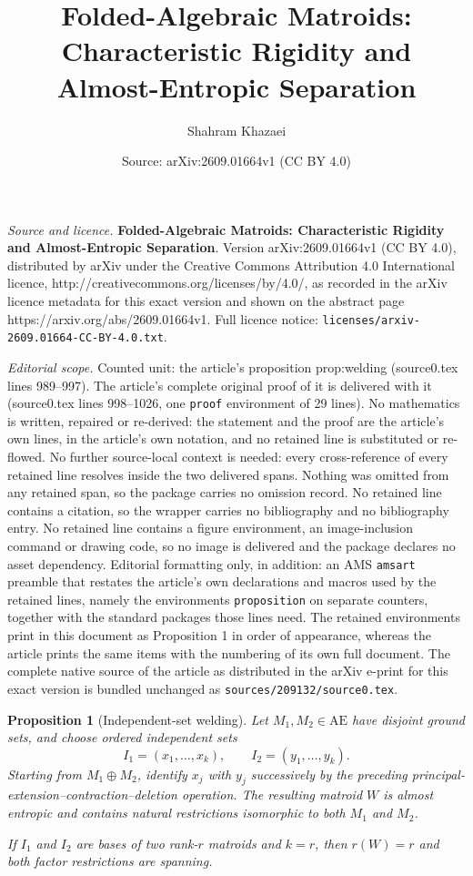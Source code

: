 \documentclass[10pt,a4paper]{amsart}
\title{\textbf{Folded-Algebraic Matroids: Characteristic Rigidity and Almost-Entropic Separation}}
\author{Shahram Khazaei}
\date{Source: arXiv:2609.01664v1 (CC BY 4.0)}
\newtheorem{proposition}{Proposition}
\newcommand{\AlmostEnt}{\mathrm{AE}}
\begin{document}
\maketitle

\noindent\emph{Source and licence.} \textbf{Folded-Algebraic Matroids: Characteristic Rigidity and Almost-Entropic Separation}. Version arXiv:2609.01664v1 (CC BY 4.0), distributed by arXiv under the Creative Commons Attribution 4.0 International licence, http://creativecommons.org/licenses/by/4.0/, as recorded in the arXiv licence metadata for this exact version and shown on the abstract page https://arxiv.org/abs/2609.01664v1. Full licence notice: \texttt{licenses/arxiv-2609.01664-CC-BY-4.0.txt}.\par\smallskip

\noindent\textit{Editorial scope.} Counted unit: the article's proposition prop:welding (source0.tex lines 989--997). The article's complete original proof of it is delivered with it (source0.tex lines 998--1026, one \texttt{proof} environment of 29 lines). No mathematics is written, repaired or re-derived: the statement and the proof are the article's own lines, in the article's own notation, and no retained line is substituted or re-flowed.  No further source-local context is needed: every cross-reference of every retained line resolves inside the two delivered spans.  Nothing was omitted from any retained span, so the package carries no omission record.  No retained line contains a citation, so the wrapper carries no bibliography and no bibliography entry.  No retained line contains a figure environment, an image-inclusion command or drawing code, so no image is delivered and the package declares no asset dependency.  Editorial formatting only, in addition: an AMS \texttt{amsart} preamble that restates the article's own declarations and macros used by the retained lines, namely the environments \texttt{proposition} on separate counters, together with the standard packages those lines need.  The retained environments print in this document as Proposition 1 in order of appearance, whereas the article prints the same items with the numbering of its own full document.  The complete native source of the article as distributed in the arXiv e-print for this exact version is bundled unchanged as \texttt{sources/209132/source0.tex}.
\begin{proposition}[Independent-set welding]\label{prop:welding}
Let $M_1,M_2\in\AlmostEnt$ have disjoint ground sets, and choose ordered independent sets
\[
I_1=(x_1,\dots,x_k),\qquad I_2=(y_1,\dots,y_k).
\]
Starting from $M_1\oplus M_2$, identify $x_j$ with $y_j$ successively by the preceding principal-extension--contraction--deletion operation.  The resulting matroid $W$ is almost entropic and contains natural restrictions isomorphic to both $M_1$ and $M_2$.

If $I_1$ and $I_2$ are bases of two rank-$r$ matroids and $k=r$, then $r(W)=r$ and both factor restrictions are spanning.
\end{proposition}
\end{document}
